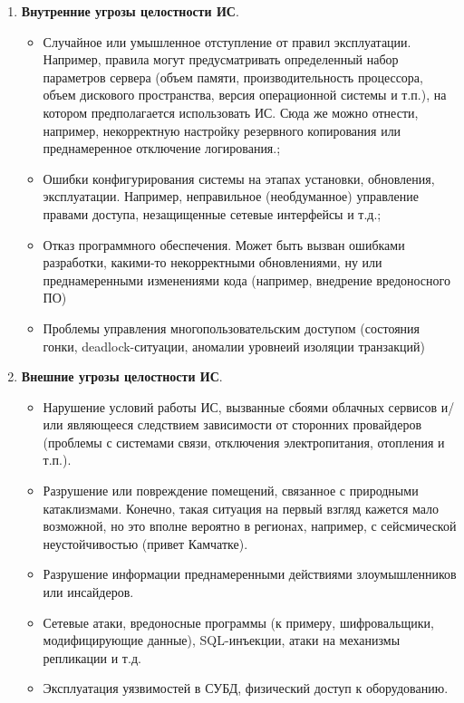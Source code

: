 \begin{enumerate}
\item \textbf{Внутренние угрозы целостности ИС}.
    \begin{itemize}
        \item Случайное или умышленное отступление от правил эксплуатации. Например, правила могут предусматривать определенный набор параметров сервера (объем памяти, производительность процессора, объем дискового пространства, версия операционной системы и т.п.), на котором предполагается использовать ИС. Сюда же можно отнести, например, некорректную настройку резервного копирования или преднамеренное отключение логирования.;
        \item Ошибки конфигурирования системы на этапах установки, обновления, эксплуатации. Например, неправильное (необдуманное) управление правами доступа, незащищенные сетевые интерфейсы и т.д.;
        \item Отказ программного обеспечения. Может быть вызван ошибками разработки, какими-то некорректными обновлениями, ну или преднамеренными изменениями кода (например, внедрение вредоносного ПО)
	\item Проблемы управления многопользовательским доступом (состояния гонки, deadlock-ситуации, аномалии уровнеий изоляции транзакций)
    \end{itemize}

\item \textbf{Внешние угрозы целостности ИС}.
    \begin{itemize}
        \item Нарушение условий работы ИС, вызванные сбоями облачных сервисов и/или являющееся следствием зависимости от сторонних провайдеров (проблемы с системами связи, отключения электропитания, отопления и т.п.).
        \item Разрушение или повреждение помещений, связанное с природными катаклизмами. Конечно, такая ситуация на первый взгляд кажется мало возможной, но это вполне вероятно в регионах, например, с сейсмической неустойчивостью (привет Камчатке).
        \item Разрушение информации преднамеренными действиями злоумышленников или инсайдеров.
        \item Сетевые атаки, вредоносные программы (к примеру, шифровальщики, модифицирующие данные), SQL-инъекции, атаки на механизмы репликации и т.д.
	\item Эксплуатация уязвимостей в СУБД, физический доступ к оборудованию.
    \end{itemize}
\end{enumerate}

